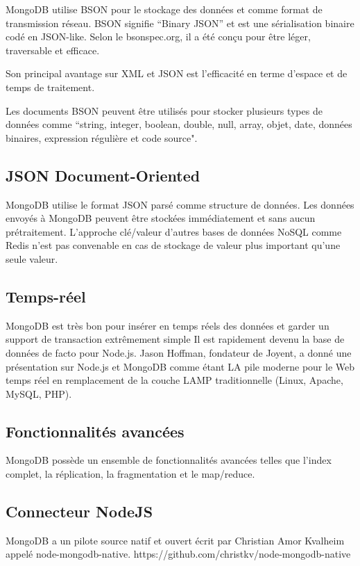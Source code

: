 MongoDB utilise BSON pour le stockage des données et comme format de transmission réseau. BSON signifie “Binary JSON” et est une sérialisation binaire codé en JSON-like.
Selon le bsonspec.org, il a été conçu pour être léger, traversable et efficace.

Son principal avantage sur XML et JSON est l’efficacité en terme d’espace et de temps de traitement.

Les documents BSON peuvent être utilisés pour stocker plusieurs types de données comme “string, integer, boolean, double, null, array, objet, date, données binaires, expression régulière et code source".

\subsection{JSON Document-Oriented}

MongoDB utilise le format JSON parsé comme structure de données. Les données envoyés à MongoDB peuvent être stockées immédiatement et sans aucun prétraitement. L’approche clé/valeur d’autres bases de données NoSQL comme Redis n’est pas convenable en cas de stockage de valeur plus important qu’une seule valeur.

\subsection{Temps-réel}

MongoDB est très bon pour insérer en temps réels des données et garder un support de transaction extrêmement simple
Il est rapidement devenu la base de données de facto pour Node.js. Jason Hoffman, fondateur de Joyent, a donné une présentation sur Node.js et MongoDB comme étant LA pile moderne pour le Web temps  réel en remplacement de la couche LAMP traditionnelle (Linux, Apache, MySQL, PHP).

\subsection{Fonctionnalités avancées}

MongoDB possède un ensemble de fonctionnalités avancées telles que l’index complet, la réplication, la fragmentation et le map/reduce.

\subsection{Connecteur NodeJS}

MongoDB a un pilote source natif et ouvert écrit par Christian Amor Kvalheim appelé node-mongodb-native.
https://github.com/christkv/node-mongodb-native

